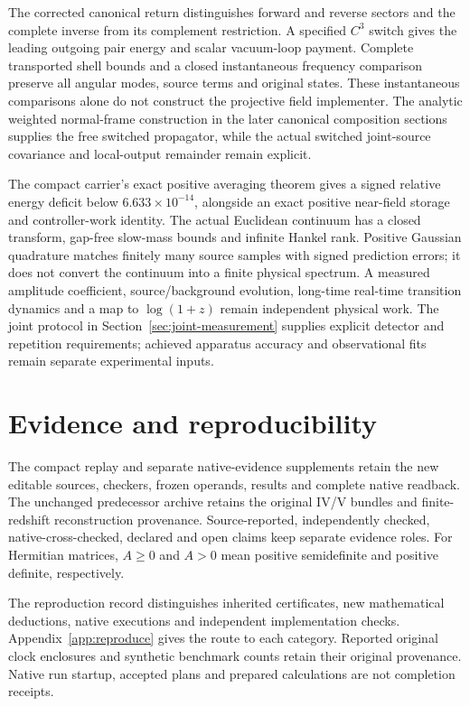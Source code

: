 \documentclass[10pt,twocolumn,letterpaper]{article}
\begin{document}
The corrected canonical return distinguishes forward and reverse sectors and the complete inverse from its complement restriction. A specified $C^3$ switch gives the leading outgoing pair energy and scalar vacuum-loop payment. Complete transported shell bounds and a closed instantaneous frequency comparison preserve all angular modes, source terms and original states. These instantaneous comparisons alone do not construct the projective field implementer. The analytic weighted normal-frame construction in the later canonical composition sections supplies the free switched propagator, while the actual switched joint-source covariance and local-output remainder remain explicit.

The compact carrier's exact positive averaging theorem gives a signed relative energy deficit below $6.633\times10^{-14}$, alongside an exact positive near-field storage and controller-work identity. The actual Euclidean continuum has a closed transform, gap-free slow-mass bounds and infinite Hankel rank. Positive Gaussian quadrature matches finitely many source samples with signed prediction errors; it does not convert the continuum into a finite physical spectrum. A measured amplitude coefficient, source/background evolution, long-time real-time transition dynamics and a map to $\log(1+z)$ remain independent physical work. The joint protocol in Section~\ref{sec:joint-measurement} supplies explicit detector and repetition requirements; achieved apparatus accuracy and observational fits remain separate experimental inputs.

\section{Evidence and reproducibility}
The compact replay and separate native-evidence supplements retain the new editable sources, checkers, frozen operands, results and complete native readback. The unchanged predecessor archive retains the original IV/V bundles and finite-redshift reconstruction provenance. Source-reported, independently checked, native-cross-checked, declared and open claims keep separate evidence roles. For Hermitian matrices, $A\ge 0$ and $A>0$ mean positive semidefinite and positive definite, respectively.

The reproduction record distinguishes inherited certificates, new mathematical deductions, native executions and independent implementation checks. Appendix~\ref{app:reproduce} gives the route to each category. Reported original clock enclosures and synthetic benchmark counts retain their original provenance. Native run startup, accepted plans and prepared calculations are not completion receipts.
\end{document}
